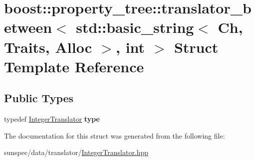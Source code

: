 \hypertarget{structboost_1_1property__tree_1_1translator__between_3_01std_1_1basic__string_3_01_ch_00_01_trai68e7b98b9780158b0b8fd628ea808a28}{}\section{boost\+:\+:property\+\_\+tree\+:\+:translator\+\_\+between$<$ std\+:\+:basic\+\_\+string$<$ Ch, Traits, Alloc $>$, int $>$ Struct Template Reference}
\label{structboost_1_1property__tree_1_1translator__between_3_01std_1_1basic__string_3_01_ch_00_01_trai68e7b98b9780158b0b8fd628ea808a28}
\subsection*{Public Types}
\begin{DoxyCompactItemize}
\item 
\mbox{\label{structboost_1_1property__tree_1_1translator__between_3_01std_1_1basic__string_3_01_ch_00_01_trai68e7b98b9780158b0b8fd628ea808a28_a49100dc4d4059c002cba28ac30334cbf}} 
typedef \hyperlink{struct_integer_translator}{Integer\+Translator} {\bfseries type}
\end{DoxyCompactItemize}


The documentation for this struct was generated from the following file\+:\begin{DoxyCompactItemize}
\item 
sunspec/data/translator/\hyperlink{_integer_translator_8hpp}{Integer\+Translator.\+hpp}\end{DoxyCompactItemize}
